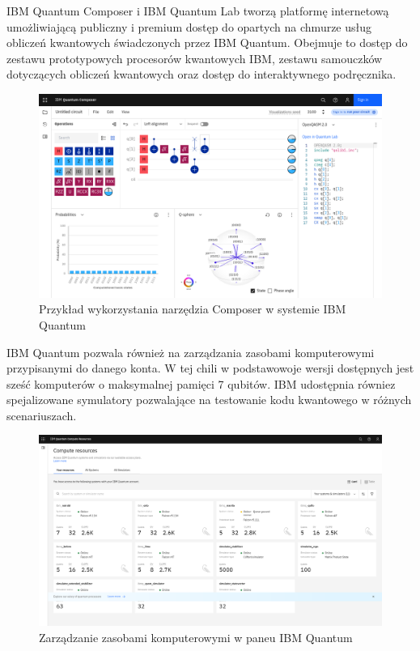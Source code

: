 \documentclass[a4paper,12pt
]{article}
\begin{document}
IBM Quantum Composer i IBM Quantum Lab tworzą platformę internetową
umożliwiającą publiczny i premium dostęp do opartych na chmurze usług
obliczeń kwantowych świadczonych przez IBM Quantum. Obejmuje to dostęp
do zestawu prototypowych procesorów kwantowych IBM, zestawu samouczków
dotyczących obliczeń kwantowych oraz dostęp do interaktywnego
podręcznika.

\begin{figure}
\centering
\includegraphics{ibm-q-composer.png}
\caption{Przykład wykorzystania narzędzia Composer w systemie IBM
Quantum}
\end{figure}

IBM Quantum pozwala również na zarządzania zasobami komputerowymi
przypisanymi do danego konta. W tej chili w podstawowoje wersji
dostępnych jest sześć komputerów o maksymalnej pamięci 7 qubitów. IBM
udostępnia równiez spejalizowane symulatory pozwalające na testowanie
kodu kwantowego w różnych scenariuszach.

\begin{figure}
\centering
\includegraphics{ibm-q-resources.png}
\caption{Zarządzanie zasobami komputerowymi w paneu IBM Quantum}
\end{figure}
\end{document}
